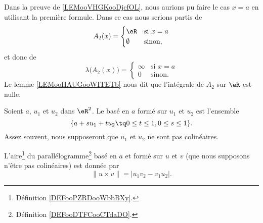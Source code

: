 \begin{remark}
	Dans la preuve de \ref{LEMooVHGKooDjcfOL}, nous aurions pu faire le cas \( x=a\) en utilisant la première formule. Dans ce cas nous serions partis de
	\begin{equation}
		A_2(x)=\begin{cases}
			\eR       & \text{si } x=a \\
			\emptyset & \text{sinon, }
		\end{cases}
	\end{equation}
	et donc de
	\begin{equation}
		\lambda\big( A_2(x) \big)=\begin{cases}
			\infty & \text{si } x=a \\
			0      & \text{sinon. }
		\end{cases}
	\end{equation}
	Le lemme \ref{LEMooHAUGooWITETb} nous dit que l'intégrale de \( A_2\) sur \( \eR\) est nulle.
\end{remark}


\begin{definition}      \label{DEFooDTFCooCTdaDO}
	Soient \( a\), \( u_1\) et \( u_2\) dans \( \eR^2\). Le  basé en \( a\) formé sur \( u_1\) et \( u_2\) est l'ensemble
	\begin{equation}
		\{ a+su_1+tu_2\tq 0\leq t\leq 1, 0\leq s\leq 1 \}.
	\end{equation}
	Assez souvent, nous supposeront que \( u_1\) et \( u_2\) ne sont pas colinéaires.
\end{definition}

\begin{proposition}     \label{PROPooAVVNooOOlSzr}
	L'aire\footnote{Définition \ref{DEFooPZRDooWbbBXy}.} du parallélogramme\footnote{Définition \ref{DEFooDTFCooCTdaDO}.}  basé en \( a\) et formé sur \( u\) et \( v\) (que nous supposons n'être pas colinéaires) est donnée par
	\begin{equation}
		\| u\times v \| =  | u_1v_2-v_1u_2 |.
	\end{equation}
\end{proposition}

